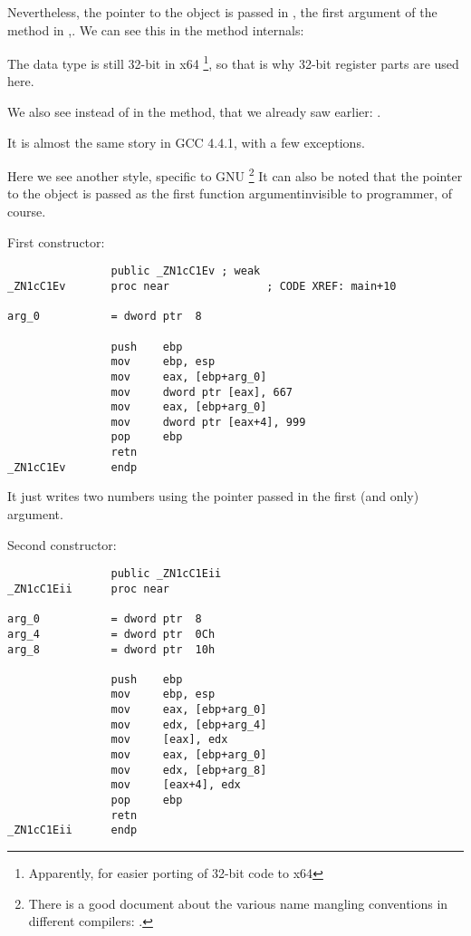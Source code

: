 Nevertheless, the \ITthis pointer to the object is passed in \RCX, the first argument of the method in \RDX,\etc{}.
We can see this in the 
 method internals:



The \Tint data type is still 32-bit in x64
\footnote{Apparently, for easier porting of 32-bit \CCpp code to x64}, 
so that is why 32-bit register parts are used here.

We also see  instead of \RET in the  method, that  we already saw
earlier: .


It is almost the same story in GCC 4.4.1, with a few exceptions.



Here we see another  style, specific to GNU
\footnote{There is a good document about the various name mangling conventions in different compilers:
\InSqBrackets{\AgnerFogCC}.}
It can also be noted that the pointer to the object is passed as the first function 
argument\EMDASH{}invisible to programmer, of course.

First constructor:

\begin{lstlisting}
                public _ZN1cC1Ev ; weak
_ZN1cC1Ev       proc near               ; CODE XREF: main+10

arg_0           = dword ptr  8

                push    ebp
                mov     ebp, esp
                mov     eax, [ebp+arg_0]
                mov     dword ptr [eax], 667
                mov     eax, [ebp+arg_0]
                mov     dword ptr [eax+4], 999
                pop     ebp
                retn
_ZN1cC1Ev       endp
\end{lstlisting}

It just writes two numbers using the pointer passed in the first (and only) argument.

Second constructor:

\begin{lstlisting}
                public _ZN1cC1Eii
_ZN1cC1Eii      proc near

arg_0           = dword ptr  8
arg_4           = dword ptr  0Ch
arg_8           = dword ptr  10h

                push    ebp
                mov     ebp, esp
                mov     eax, [ebp+arg_0]
                mov     edx, [ebp+arg_4]
                mov     [eax], edx
                mov     eax, [ebp+arg_0]
                mov     edx, [ebp+arg_8]
                mov     [eax+4], edx
                pop     ebp
                retn
_ZN1cC1Eii      endp
\end{lstlisting}

